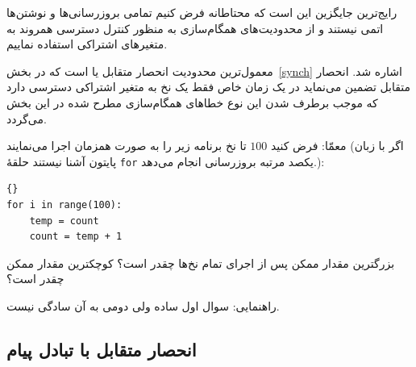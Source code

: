 \documentclass{book}
\begin{document}
    رایج‌ترین جایگزین این است که محتاطانه فرض کنیم تمامی بروزرسانی‌ها و نوشتن‌ها اتمی نیستند و 
    از محدودیت‌های همگام‌سازی به منظور کنترل دسترسی همروند به متغیرهای اشتراکی استفاده نماییم. 

    معمول‌ترین محدودیت انحصار متقابل یا  است که 
    در بخش~\ref{synch}  اشاره شد. انحصار متقابل تضمین می‌نماید در یک زمان خاص  فقط یک نخ به متغیر اشتراکی دسترسی دارد 
    که موجب برطرف شدن این نوع خطاهای همگام‌سازی مطرح شده در این بخش می‌گردد. 
    
    معمّا: فرض کنید $100$ تا نخ برنامه زیر را به صورت همزمان اجرا می‌نمایند (اگر با زبان پایتون آشنا نیستند حلقهٔ \texttt{for} یکصد مرتبه 
    بروزرسانی انجام می‌دهد.):

\begin{latin}
\begin{latin}
\begin{lstlisting}[]{}
for i in range(100):
    temp = count
    count = temp + 1
\end{lstlisting}
\end{latin}
\end{latin}

    بزرگترین مقدار ممکن  پس از اجرای تمام نخ‌ها چقدر است؟ کوچکترین مقدار ممکن چقدر است؟ 
    

    راهنمایی: سوال اول ساده ولی دومی به آن سادگی نیست. 

\subsection {انحصار متقابل با تبادل پیام}
\end{document}
